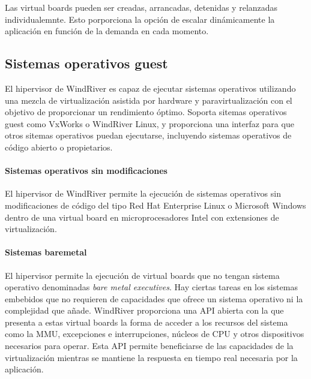 Las virtual boards pueden ser creadas, arrancadas, detenidas y relanzadas individualemnte. Esto porporciona la opción de escalar dinámicamente la aplicación en función de la demanda en cada momento.

\subsection{Sistemas operativos guest}
El hipervisor de WindRiver es capaz de ejecutar sistemas operativos utilizando una mezcla de virtualización asistida por hardware y paravirtualización con el objetivo de proporcionar un rendimiento óptimo. Soporta sitemas operativos guest como VxWorks o WindRiver Linux, y proporciona una interfaz para que otros sitemas operativos puedan ejecutarse, incluyendo sistemas operativos de código abierto o propietarios.\\

\paragraph{Sistemas operativos sin modificaciones} El hipervisor de WindRiver permite la ejecución de sistemas operativos sin modificaciones de código del tipo Red Hat Enterprise Linux o Microsoft Windows dentro de una virtual board en microprocesadores Intel con extensiones de virtualización.\\

\paragraph{Sistemas baremetal}
El hipervisor permite la ejecución de virtual boards que no tengan sistema operativo denominadas \textit{bare metal executives}. Hay ciertas tareas en los sistemas embebidos que no requieren de capacidades que ofrece un sistema operativo ni la complejidad que añade. WindRiver proporciona una API abierta con la que presenta a estas virtual boards la forma de acceder a los recursos del sistema como la MMU, excepciones e interrupciones, núcleos de CPU y otros dispositivos necesarios para operar. Esta API permite beneficiarse de las capacidades de la virtualización mientras se mantiene la respuesta en tiempo real necesaria por la aplicación.

